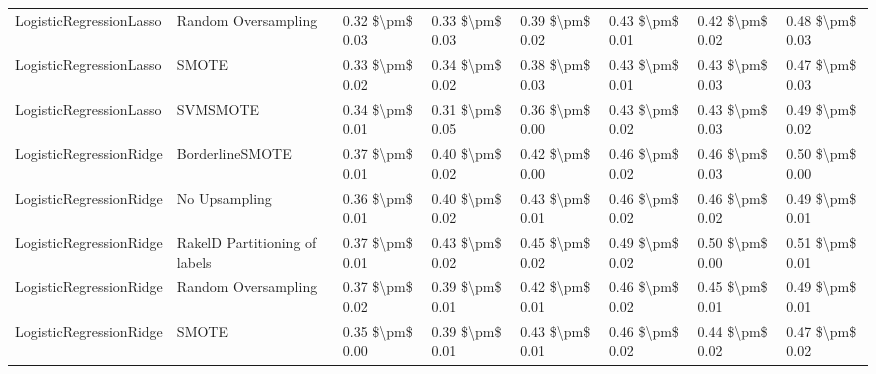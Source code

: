 \begin{tabular}{llllllll}
        LogisticRegressionLasso &           Random Oversampling & 0.32 \$\textbackslash pm\$ 0.03 &           0.33 \$\textbackslash pm\$ 0.03 &       0.39 \$\textbackslash pm\$ 0.02 &        0.43 \$\textbackslash pm\$ 0.01 &                         0.42 \$\textbackslash pm\$ 0.02 &     0.48 \$\textbackslash pm\$ 0.03 \\
        LogisticRegressionLasso &                         SMOTE & 0.33 \$\textbackslash pm\$ 0.02 &           0.34 \$\textbackslash pm\$ 0.02 &       0.38 \$\textbackslash pm\$ 0.03 &        0.43 \$\textbackslash pm\$ 0.01 &                         0.43 \$\textbackslash pm\$ 0.03 &     0.47 \$\textbackslash pm\$ 0.03 \\
        LogisticRegressionLasso &                      SVMSMOTE & 0.34 \$\textbackslash pm\$ 0.01 &           0.31 \$\textbackslash pm\$ 0.05 &       0.36 \$\textbackslash pm\$ 0.00 &        0.43 \$\textbackslash pm\$ 0.02 &                         0.43 \$\textbackslash pm\$ 0.03 &     0.49 \$\textbackslash pm\$ 0.02 \\
        LogisticRegressionRidge &               BorderlineSMOTE & 0.37 \$\textbackslash pm\$ 0.01 &           0.40 \$\textbackslash pm\$ 0.02 &       0.42 \$\textbackslash pm\$ 0.00 &        0.46 \$\textbackslash pm\$ 0.02 &                         0.46 \$\textbackslash pm\$ 0.03 &     0.50 \$\textbackslash pm\$ 0.00 \\
        LogisticRegressionRidge &                 No Upsampling & 0.36 \$\textbackslash pm\$ 0.01 &           0.40 \$\textbackslash pm\$ 0.02 &       0.43 \$\textbackslash pm\$ 0.01 &        0.46 \$\textbackslash pm\$ 0.02 &                         0.46 \$\textbackslash pm\$ 0.02 &     0.49 \$\textbackslash pm\$ 0.01 \\
        LogisticRegressionRidge & RakelD Partitioning of labels & 0.37 \$\textbackslash pm\$ 0.01 &           0.43 \$\textbackslash pm\$ 0.02 &       0.45 \$\textbackslash pm\$ 0.02 &        0.49 \$\textbackslash pm\$ 0.02 &                         0.50 \$\textbackslash pm\$ 0.00 &     0.51 \$\textbackslash pm\$ 0.01 \\
        LogisticRegressionRidge &           Random Oversampling & 0.37 \$\textbackslash pm\$ 0.02 &           0.39 \$\textbackslash pm\$ 0.01 &       0.42 \$\textbackslash pm\$ 0.01 &        0.46 \$\textbackslash pm\$ 0.02 &                         0.45 \$\textbackslash pm\$ 0.01 &     0.49 \$\textbackslash pm\$ 0.01 \\
        LogisticRegressionRidge &                         SMOTE & 0.35 \$\textbackslash pm\$ 0.00 &           0.39 \$\textbackslash pm\$ 0.01 &       0.43 \$\textbackslash pm\$ 0.01 &        0.46 \$\textbackslash pm\$ 0.02 &                         0.44 \$\textbackslash pm\$ 0.02 &     0.47 \$\textbackslash pm\$ 0.02 \\

\end{tabular}
